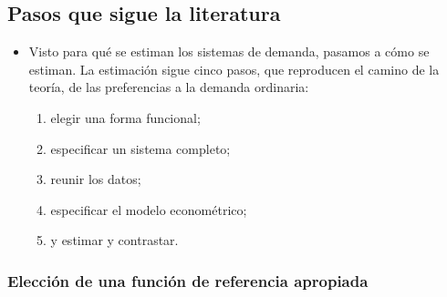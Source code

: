 \documentclass[11pt]{article}
\begin{document}
\subsection{Pasos que sigue la literatura}\label{sec:pasos-sigue-literatura}

\begin{itemize}
\item Visto para qué se estiman los sistemas de demanda, pasamos a cómo se estiman. La estimación sigue cinco pasos, que reproducen el camino de la teoría, de las preferencias a la demanda ordinaria:
  \begin{enumerate}
  \item elegir una forma funcional;
  \item especificar un sistema completo;
  \item reunir los datos;
  \item especificar el modelo econométrico;
  \item y estimar y contrastar.
  \end{enumerate}
\end{itemize}

\subsubsection{Elección de una función de referencia apropiada}\label{sec:eleccion-funcion-referencia}
\end{document}
